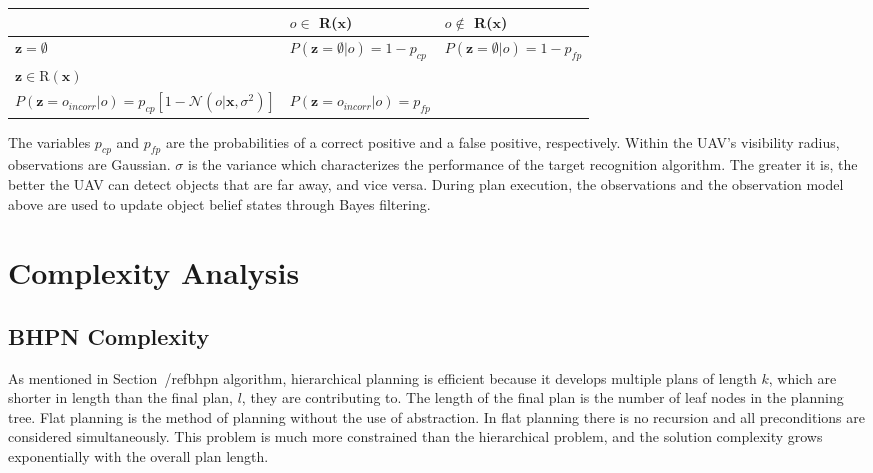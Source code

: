 \documentclass[12pt]{article}
\begin{document}
\begin{center}
\begin{tabular}{ | l | l | l |}
\hline
                                                                               & $o \in$ R($\mathbf{x}$)                                                                                & $o \notin$ R($\mathbf{x}$) \\ \hline
$\mathbf{z} = \emptyset$                                    & $P(\mathbf{z}=\emptyset|o) = 1-p_{cp}$                                                    & $P(\mathbf{z}=\emptyset| o) =1-p_{fp}$\\ \hline
$\mathbf{z} \in \text{R}(\mathbf{x})$                 &  \shortstack[l] {$P(\mathbf{z} = o|o) =p_{cp}[\mathcal{N}(\mathbf{o}|\mathbf{x},\sigma^{2})] $ \\
				                                         $P(\mathbf{z} = o_{incorr}|o) =p_{cp}[1-\mathcal{N}(o|\mathbf{x},\sigma^{2})] $    }                
																		         & $P(\mathbf{z}=o_{incorr}|o)=p_{fp}$\\ \hline
\end{tabular}
\end{center} 

The variables $p_{cp}$ and $p_{fp}$ are the probabilities of a correct positive and a false positive, respectively. Within the UAV's visibility radius, observations are Gaussian. $\sigma$ is the variance which characterizes the performance of the target recognition algorithm. The greater it is, the better the UAV can detect objects that are far away, and vice versa. During plan execution, the observations and the observation model above are used to update object belief states through Bayes filtering. 

\section{Complexity Analysis}
\subsection{BHPN Complexity}

As mentioned in Section~/ref{bhpn algorithm}, hierarchical planning is efficient because it develops multiple plans of length $k$, which are shorter in length than the final plan, $l$, they are contributing to. The length of the final plan is the number of leaf nodes in the planning tree. Flat planning is the method of planning without the use of abstraction. In flat planning there is no recursion and all preconditions are considered simultaneously. This problem is much more constrained than the hierarchical problem, and the solution complexity grows exponentially with the overall plan length.
\end{document}
